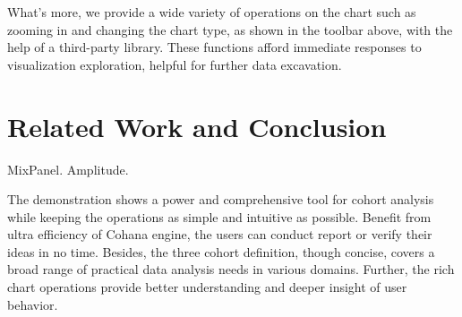 \documentclass[10pt,conference,letterpaper]{IEEEtran}
\begin{document}
What's more, we provide a wide variety of operations on the chart such as zooming in and changing the chart type, as shown in the toolbar above, with the help of a third-party library. These functions afford immediate responses to visualization exploration, helpful for further data excavation.

\section{Related Work and Conclusion}

MixPanel. Amplitude. 

The demonstration shows a power and comprehensive tool for cohort analysis while keeping the operations as simple and intuitive as possible. Benefit from ultra efficiency of Cohana engine, the users can conduct report or verify their ideas in no time. Besides, the three cohort definition, though concise, covers a broad range of practical data analysis needs in various domains. Further, the rich chart operations provide better understanding and deeper insight of user behavior.







\end{document}

